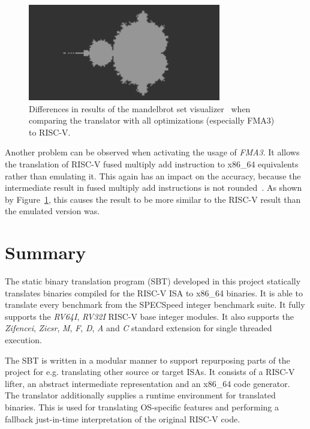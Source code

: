\documentclass[course=eragp]{aspdoc}
\begin{document}
\par

\begin{figure}[H]
    \centering
    \includegraphics[width=0.75\textwidth]{images/mandelbrot_differences/fma_diff.png}
    \caption{Differences in results of the mandelbrot set visualizer~\cite{mandelbrot_program} when
        comparing the translator with all optimizations (especially FMA3) to RISC-V.}\label{fig:mandelbrot_diff_fma3}
\end{figure}

Another problem can be observed when activating the usage of \textit{FMA3}. It allows the
translation of RISC-V fused multiply add instruction to x86\_64 equivalents rather than emulating
it. This again has an impact on the accuracy, because the intermediate result in fused multiply add
instructions is not rounded~\cite{intel2017man}. As shown by
Figure~\ref{fig:mandelbrot_diff_fma3}, this causes the result to be more similar to the RISC-V result
than the emulated version was.

\section{Summary}

The static binary translation program (SBT) developed in this project statically translates binaries
compiled for the RISC-V ISA to x86\_64 binaries. It is able to translate every benchmark
from the SPECSpeed integer benchmark suite. It fully supports the \textit{RV64I},
\textit{RV32I} RISC-V base integer modules. It also supports the \textit{Zifencei}, \textit{Zicsr},
\textit{M}, \textit{F}, \textit{D}, \textit{A} and \textit{C} standard extension for single threaded
execution.

\par

The SBT is written in a modular manner to support repurposing parts of the project for e.g.
translating other source or target ISAs. It consists of a RISC-V lifter, an abstract intermediate
representation and an x86\_64 code generator. The translator additionally supplies a runtime
environment for translated binaries. This is used for translating OS-specific features and
performing a fallback just-in-time interpretation of the original RISC-V code.
\end{document}
